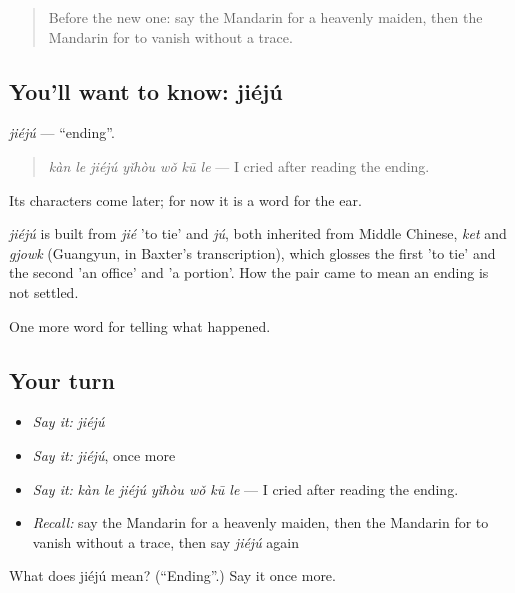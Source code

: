 \label{lesson:ZH-C329-jieju}



\begin{quote}
Before the new one: say the Mandarin for a heavenly maiden, then the Mandarin for to vanish without a trace.
\end{quote}

\subsection*{You'll want to know: jiéjú}
\emph{jiéjú} — \textquotedblleft{}ending\textquotedblright{}.

\begin{quote}
\emph{kàn le jiéjú yǐhòu wǒ kū le} — I cried after reading the ending.
\end{quote}

Its characters come later; for now it is a word for the ear.

\begin{cousinweb}
\emph{jiéjú} is built from \emph{jié} 'to tie' and \emph{jú}, both inherited from Middle Chinese, \emph{ket} and \emph{gjowk} (Guangyun, in Baxter's transcription), which glosses the first 'to tie' and the second 'an office' and 'a portion'. How the pair came to mean an ending is not settled.
\end{cousinweb}

\begin{grammarlens}[title={What you've built}]
One more word for telling what happened.
\end{grammarlens}

\subsection*{Your turn}
\begin{itemize}
\raggedright
  \item \emph{Say it:} \emph{jiéjú}
  \item \emph{Say it:} \emph{jiéjú}, once more
  \item \emph{Say it:} \emph{kàn le jiéjú yǐhòu wǒ kū le} — I cried after reading the ending.
  \item \emph{Recall:} say the Mandarin for a heavenly maiden, then the Mandarin for to vanish without a trace, then say \emph{jiéjú} again
\end{itemize}

\begin{tcolorbox}[breakable,colback=teal!4,colframe=teal!35!black,title={Before you move on}]
What does jiéjú mean? (\textquotedblleft{}Ending\textquotedblright{}.) Say it once more.
\end{tcolorbox}
